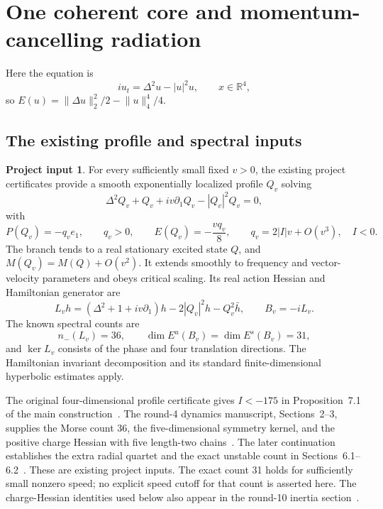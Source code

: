 \documentclass[11pt]{article}
\theoremstyle{definition}
\newtheorem{assumption}[theorem]{Project input}
\theoremstyle{remark}
\newcommand{\R}{\mathbb R}
\newcommand{\norm}[1]{\lVert #1\rVert}
\begin{document}
\section{One coherent core and momentum-cancelling radiation}
\label{sec:radiation}

Here the equation is
\begin{equation}\label{eq:4dbnls}
 iu_t=\Delta^2u-|u|^2u,\qquad x\in\R^4,
\end{equation}
so $E(u)=\norm{\Delta u}_2^2/2-\norm{u}_4^4/4$.

\subsection{The existing profile and spectral inputs}\label{sec:input}

\begin{assumption}\label{ass:cert}
For every sufficiently small fixed $v>0$, the existing project certificates provide a smooth exponentially localized profile $Q_v$ solving
\[
 \Delta^2Q_v+Q_v+iv\partial_1Q_v-|Q_v|^2Q_v=0,
\]
with
\begin{equation}\label{eq:wavecharges}
 P(Q_v)=-q_v e_1,\qquad q_v>0,\qquad
 E(Q_v)=-\frac{vq_v}{8},\qquad
 q_v=2|I|v+O(v^3),\quad I<0.
\end{equation}
The branch tends to a real stationary excited state $Q$, and $M(Q_v)=M(Q)+O(v^2)$. It extends smoothly to frequency and vector-velocity parameters and obeys critical scaling. Its real action Hessian and Hamiltonian generator are
\[
 L_vh=(\Delta^2+1+iv\partial_1)h-2|Q_v|^2h-Q_v^2\bar h,
 \qquad B_v=-iL_v.
\]
The known spectral counts are
\begin{equation}\label{eq:spectralinput}
 n_-(L_v)=36,\qquad
 \dim E^u(B_v)=\dim E^s(B_v)=31,
\end{equation}
and $\ker L_v$ consists of the phase and four translation directions. The Hamiltonian invariant decomposition and its standard finite-dimensional hyperbolic estimates apply.
\end{assumption}

The original four-dimensional profile certificate gives $I<-175$ in Proposition~7.1 of the main construction~\cite{ProjectProfile}. The round-4 dynamics manuscript, Sections~2--3, supplies the Morse count 36, the five-dimensional symmetry kernel, and the positive charge Hessian with five length-two chains~\cite{ProjectR4}. The later continuation establishes the extra radial quartet and the exact unstable count in Sections~6.1--6.2~\cite{ProjectR5}. These are existing project inputs. The exact count 31 holds for sufficiently small nonzero speed; no explicit speed cutoff for that count is asserted here. The charge-Hessian identities used below also appear in the round-10 inertia section~\cite{ProjectR10}.
\end{document}

